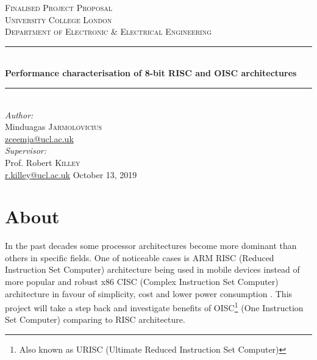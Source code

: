 \documentclass[a4paper,11pt]{article}
\begin{document}
\begin{titlepage}
	\newcommand{\HRule}{\rule{\linewidth}{0.5mm}}
	\center
	\textsc{\LARGE Finalised Project Proposal}\\[1.5cm]
	\textsc{\Large University College London}\\[0.5cm]
	\textsc{\large Department of Electronic \& Electrical Engineering}\\[0.5cm]
	
	\HRule \\[0.4cm]
	{ \huge \bfseries Performance characterisation of 8-bit RISC and OISC architectures}\\[0.4cm]
	\HRule \\[1.0cm]
	
	\Large \emph{Author:}\\
	Minduagas \textsc{Jarmolovicius}\\
	\href{mailto:zceemja@ucl.ac.uk}{zceemja@ucl.ac.uk}\\[0.5cm]
	
	\Large \emph{Supervisor:}\\
	Prof. Robert \textsc{Killey}\\
	\href{mailto:r.killey@ucl.ac.uk}{r.killey@ucl.ac.uk}
	\vfill
	{\large October 13, 2019}\\[2cm]
	
\end{titlepage}

	

\pagebreak
\section{About}
In the past decades some processor architectures become more dominant than others in specific fields. One of noticeable cases is ARM RISC (Reduced Instruction Set Computer) architecture being used in mobile devices instead of more popular and robust x86 CISC (Complex Instruction Set Computer) architecture in favour of simplicity, cost and lower power consumption \cite{risc_vs_cisc,x}. This project will take a step back and investigate benefits of OISC\footnote{Also known as URISC (Ultimate Reduced Instruction Set Computer)} (One Instruction Set Computer) comparing to RISC architecture. 
\end{document}

